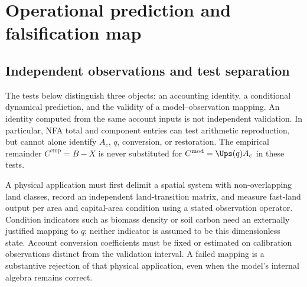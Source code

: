 \section{Operational prediction and falsification map}\label{si:predictionmap}

\subsection{Independent observations and test separation}
The tests below distinguish three objects: an accounting identity, a conditional dynamical prediction, and the validity of a model--observation mapping. An identity computed from the same account inputs is not independent validation. In particular, NFA total and component entries can test arithmetic reproduction, but cannot alone identify $A_c$, $q$, conversion, or restoration. The empirical remainder $C^{\mathrm{emp}}=B-X$ is never substituted for $C^{\mathrm{mod}}=\Ups(q)A_c$ in these tests.

A physical application must first delimit a spatial system with non-overlapping land classes, record an independent land-transition matrix, and measure fast-land output per area and capital-area condition using a stated observation operator. Condition indicators such as biomass density or soil carbon need an externally justified mapping to $q$; neither indicator is assumed to be this dimensionless state. Account conversion coefficients must be fixed or estimated on calibration observations distinct from the validation interval. A failed mapping is a substantive rejection of that physical application, even when the model's internal algebra remains correct.


